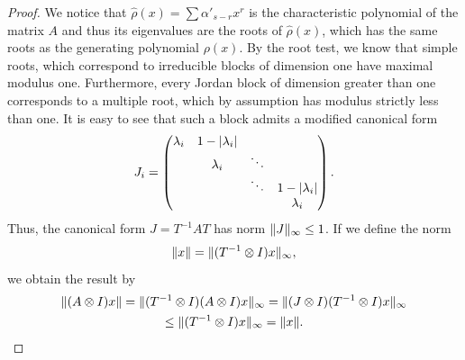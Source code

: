 \begin{proof}
  We notice that $\widehat\rho(x) = \sum \alpha'_{s-r} x^r$ is the
  characteristic polynomial of the matrix $A$ and thus its eigenvalues
  are the roots of $\widehat\rho(x)$, which has the same roots as the
  generating polynomial $\rho(x)$. By the root test, we know that
  simple roots, which correspond to irreducible blocks of dimension
  one have maximal modulus one. Furthermore, every Jordan block of
  dimension greater than one corresponds to a multiple root, which by
  assumption has modulus strictly less than one. It is easy to see
  that such a block admits a modified canonical form
  \begin{gather*}
    J_i =
    \begin{pmatrix}
      \lambda_i & 1- \lvert\lambda_i\rvert\\
        & \lambda_i &\ddots\\
          &&\ddots & 1- \lvert\lambda_i\rvert\\
            &&&\lambda_i
    \end{pmatrix}.
  \end{gather*}
  Thus, the canonical form $J = T^{-1}AT$ has norm $\lVert J\rVert_{\infty}
  \le 1$. If we define the norm
  \begin{gather*}
    \lVert x\rVert = \lVert(T^{-1}\otimes I)x\rVert_\infty,
  \end{gather*}
  we obtain the result by
  \begin{multline*}
    \lVert(A\otimes I)x\rVert
    = \lVert(T^{-1}\otimes I)(A\otimes I)x\rVert_\infty
    = \lVert(J\otimes I)(T^{-1}\otimes I)x\rVert_\infty
    \\
    \le \lVert(T^{-1}\otimes I)x\rVert_\infty
    = \lVert x\rVert.
  \end{multline*}
\end{proof}



